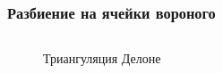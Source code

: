 \documentclass[pdf,hyperref={unicode}]{beamer}
\begin{document}
\begin{frame}%
\transdissolve[duration=0.2]
\frametitle{Разбиение на ячейки вороного}

\begin{columns}

{
\begin{column}{0.3\linewidth}
\begin{figure}[h]
\caption{Триангуляция Делоне}
\end{figure}
\end{column}
}


\end{columns}
\end{frame}
\end{document}
